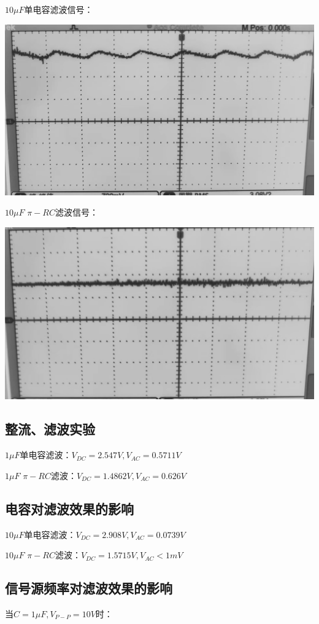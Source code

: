 \documentclass[a4paper]{ltxdoc}
\newenvironment{Figure}
{\par\medskip\noindent\minipage{\linewidth}}
{\endminipage\par\medskip}
\begin{document}
\begin{multicols}{2}
    $10\mu F$单电容滤波信号：
    \begin{Figure}
        \centering
        \includegraphics[width=0.7\linewidth]{img/done_edit/7.png}
    \end{Figure}

    $10\mu F$ $\pi - RC$滤波信号：
    \begin{Figure}
        \centering
        \includegraphics[width=0.7\linewidth]{img/done_edit/6.png}
    \end{Figure}

    \subsection{整流、滤波实验}
    $1\mu F$单电容滤波：$V_{DC} = 2.547 V, V_{AC} = 0.5711V$

    $1\mu F$ $\pi - RC$滤波：$V_{DC} = 1.4862 V, V_{AC} = 0.626V$
    \subsection{电容对滤波效果的影响}
    $10\mu F$单电容滤波：$V_{DC} = 2.908 V, V_{AC} = 0.0739V$

    $10\mu F$ $\pi - RC$滤波：$V_{DC} = 1.5715 V, V_{AC} <1mV$
\end{multicols}

\dotfill
\smallskip
\subsection{信号源频率对滤波效果的影响}
当$C=1\mu F, V_{P-P} = 10V$时：
\end{document}
